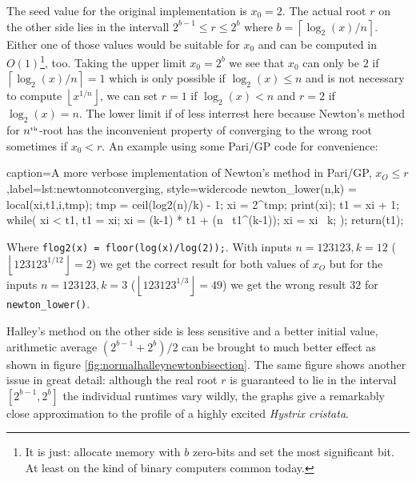 \documentclass[a4paper,10pt]{report}
\providecommand{\floor}[1]{\left\lfloor#1\right\rfloor}
\providecommand{\ceil}[1]{\left\lceil#1\right\rceil}
\newcommand{\nthroot}{$n^{\text{\tiny th}}$-root}
\theoremstyle{plain} %
\theoremstyle{definition}
\theoremstyle{remark}
\begin{document}
The seed value for the original implementation is $x_0 = 2$. The actual root $r$ on the other side lies in the intervall $2^{b-1} \leq r \leq 2^b$ where $b = \ceil{\log_2(x)/n}$. Either one of those values would be suitable for $x_0$ and can be computed in $O(1)$\footnote{It is just: allocate memory with $b$ zero-bits and set the most significant bit. At least on the kind of binary computers common today.}, too. Taking the upper limit $x_0 = 2^b$ we see that $x_0$ can only be $2$ if $\ceil{\log_2(x)/n} = 1$ which is only possible if $\log_2(x) \leq n$ and is not necessary to compute $\floor{x^{1/n}}$, we can set $r = 1$ if $\log_2(x) < n$ and $r = 2$ if $\log_2(x) = n$. The lower limit if of less interrest here because Newton's method for \nthroot{} has the inconvenient property of converging to the wrong root sometimes if $x_0 < r$. An example using some Pari/GP code for convenience:

\lstset{language=parigp,style=code}
\begin{pblisting}{caption={A more verbose implementation of Newton's method in Pari/GP, $x_O \leq r$},label=lst:newtonnotconverging, style=widercode}
newton_lower(n,k) = {
   local(xi,t1,i,tmp);
   tmp = ceil(log2(n)/k) - 1;
   xi = 2^tmp;
   print(xi);
   t1 = xi + 1;
   while(
      xi < t1,
      t1 = xi;
      xi = (k-1) * t1 + (n \ t1^(k-1));
      xi = xi \ k;
   );
   return(t1);
}
\end{pblisting}

Where \lstinline!flog2(x) = floor(log(x)/log(2));!. With inputs $n = 123123, k = 12$ ($\floor{123123^{1/12}} = 2$) we get the correct result for both values of $x_O$ but for the inputs $n = 123123, k = 3$ ($\floor{123123^{1/3}} = 49$) we get the wrong result $32$ for \lstinline!newton_lower()!.

Halley's method on the other side is less sensitive and a better initial value, arithmetic average $(2^{b-1} + 2^b)/2$ can be brought to much better effect as shown in figure \ref{fig:normalhalleynewtonbisection}. The same figure shows another issue in great detail: although the real root $r$ is guaranteed to lie in the interval $[2^{b-1}, 2^b]$ the individual runtimes vary wildly, the graphs give a remarkably close approximation to the profile of a highly excited \textit{Hystrix cristata}.

\begin{center}

\end{center}
\end{document}
